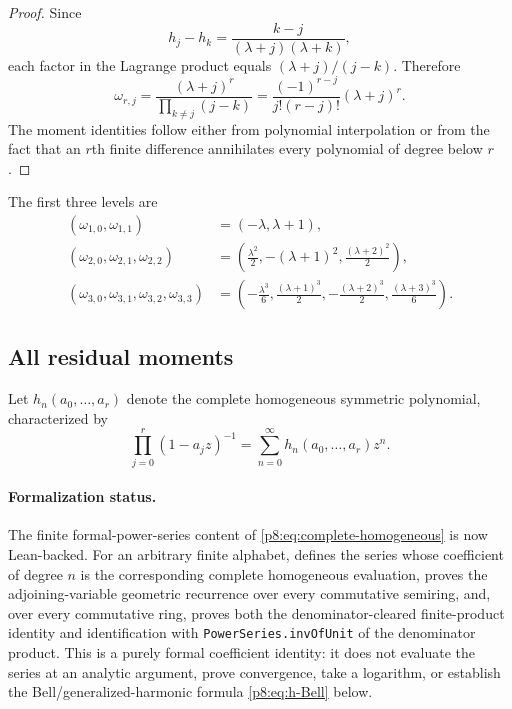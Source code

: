 \documentclass[11pt]{article}
\numberwithin{equation}{section}
\theoremstyle{definition}
\theoremstyle{remark}
\begin{document}
\begin{proof}
Since
\[
h_j-h_k=\frac{k-j}{(\lambda+j)(\lambda+k)},
\]
each factor in the Lagrange product equals $(\lambda+j)/(j-k)$. Therefore
\[
\omega_{r,j}=\frac{(\lambda+j)^r}
{\prod_{k\ne j}(j-k)}
=\frac{(-1)^{r-j}}{j!(r-j)!}(\lambda+j)^r.
\]
The moment identities follow either from polynomial interpolation or from the fact that an $r$th finite difference annihilates every polynomial of degree below $r$.
\end{proof}

The first three levels are
\begin{align}
(\omega_{1,0},\omega_{1,1})
&=(-\lambda,\lambda+1),
\label{p8:eq:omega1}\\
(\omega_{2,0},\omega_{2,1},\omega_{2,2})
&=\left(\frac{\lambda^2}{2},-(\lambda+1)^2,
\frac{(\lambda+2)^2}{2}\right),
\label{p8:eq:omega2}\\
(\omega_{3,0},\omega_{3,1},\omega_{3,2},\omega_{3,3})
&=\left(-\frac{\lambda^3}{6},\frac{(\lambda+1)^3}{2},
-\frac{(\lambda+2)^3}{2},\frac{(\lambda+3)^3}{6}\right).
\label{p8:eq:omega3}
\end{align}

\subsection{All residual moments}

Let $h_n(a_0,\ldots,a_r)$ denote the complete homogeneous symmetric polynomial, characterized by
\begin{equation}
\prod_{j=0}^{r}(1-a_jz)^{-1}
=\sum_{n=0}^{\infty}h_n(a_0,\ldots,a_r)z^n.
\label{p8:eq:complete-homogeneous}
\end{equation}

\paragraph{Formalization status.}
The finite formal-power-series content of
\cref{p8:eq:complete-homogeneous} is now Lean-backed.  For an arbitrary
finite alphabet,  defines the series
whose coefficient of degree $n$ is the corresponding complete homogeneous
evaluation, proves the adjoining-variable geometric recurrence over every
commutative semiring, and, over every commutative ring, proves both the
denominator-cleared finite-product identity and identification with
\texttt{PowerSeries.invOfUnit} of the denominator product.  This is a purely
formal coefficient identity: it does not evaluate the series at an analytic
argument, prove convergence, take a logarithm, or establish the
Bell/generalized-harmonic formula \eqref{p8:eq:h-Bell} below.
\end{document}
